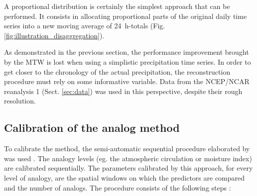 \documentclass[hess, manuscript]{copernicus}
\begin{document}
A proportional distribution is certainly the simplest approach that can be performed. It consists in allocating proportional parts of the original daily time series into a new moving average of 24~h-totals (Fig. \ref{fig:illustration_disaggregation}). 

As demonstrated in the previous section, the performance improvement brought by the MTW is lost when using a simplistic precipitation time series. In order to get closer to the chronology of the actual precipitation, the reconstruction procedure must rely on some informative variable. Data from the NCEP/NCAR reanalysis 1 (Sect. \ref{sec:data}) was used in this perspective, despite their rough resolution.


\subsection{Calibration of the analog method}
\label{sec:calibration}

To calibrate the method, the semi-automatic sequential procedure elaborated by \citet{Bontron2004} was used \cite[see also ][]{Horton2012a, BenDaoud2016}. The analogy levels (eg. the atmospheric circulation or moisture index) are calibrated sequentially. The parameters calibrated by this approach, for every level of analogy, are the spatial windows on which the predictors are compared and the number of analogs. The procedure consists of the following steps \citep{Bontron2004}:
\end{document}
